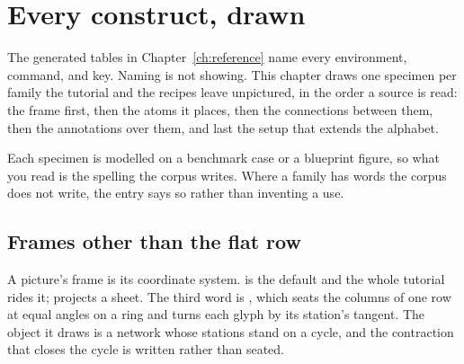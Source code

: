 \section{Every construct, drawn}\label{ch:catalogue}

The generated tables in Chapter~\ref{ch:reference} name every environment,
command, and key.  Naming is not showing.  This chapter draws one specimen
per family the tutorial and the recipes leave unpictured, in the order a
source is read: the frame first, then the atoms it places, then the
connections between them, then the annotations over them, and last the
setup that extends the alphabet.

Each specimen is modelled on a benchmark case or a blueprint figure, so
what you read is the spelling the corpus writes.  Where a family has words
the corpus does not write, the entry says so rather than inventing a use.

\subsection{Frames other than the flat row}

A picture's frame is its coordinate system.   is
the default and the whole tutorial rides it;  projects a
sheet.  The third word is , which seats the columns of one
row at equal angles on a ring and turns each glyph by its station's
tangent.  The object it draws is a network whose stations stand on a
cycle, and the contraction that closes the cycle is written rather than
seated.

